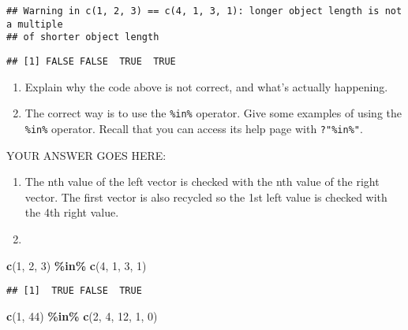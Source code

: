 \documentclass[
]{article}
\newenvironment{Shaded}{\begin{snugshade}}{\end{snugshade}}
\newcommand{\DecValTok}[1]{\textcolor[rgb]{0.00,0.00,0.81}{#1}}
\newcommand{\KeywordTok}[1]{\textcolor[rgb]{0.13,0.29,0.53}{\textbf{#1}}}
\newcommand{\NormalTok}[1]{#1}
\newcommand{\OperatorTok}[1]{\textcolor[rgb]{0.81,0.36,0.00}{\textbf{#1}}}
\newcommand{\StringTok}[1]{\textcolor[rgb]{0.31,0.60,0.02}{#1}}
\providecommand{\tightlist}{%
  \setlength{\itemsep}{0pt}\setlength{\parskip}{0pt}}
\begin{document}
\begin{verbatim}
## Warning in c(1, 2, 3) == c(4, 1, 3, 1): longer object length is not a multiple
## of shorter object length
\end{verbatim}

\begin{verbatim}
## [1] FALSE FALSE  TRUE  TRUE
\end{verbatim}

\begin{enumerate}
\def\labelenumi{\arabic{enumi}.}
\item
  Explain why the code above is not correct, and what's actually
  happening.
\item
  The correct way is to use the \texttt{\%in\%} operator. Give some
  examples of using the \texttt{\%in\%} operator. Recall that you can
  access its help page with \texttt{?"\%in\%"}.
\end{enumerate}

YOUR ANSWER GOES HERE:

\begin{enumerate}
\def\labelenumi{\arabic{enumi}.}
\tightlist
\item
  The nth value of the left vector is checked with the nth value of the
  right vector. The first vector is also recycled so the 1st left value
  is checked with the 4th right value.
\item
\end{enumerate}

\begin{Shaded}
\begin{Highlighting}[]
\KeywordTok{c}\NormalTok{(}\DecValTok{1}\NormalTok{, }\DecValTok{2}\NormalTok{, }\DecValTok{3}\NormalTok{) }\OperatorTok{\%in\%}\StringTok{ }\KeywordTok{c}\NormalTok{(}\DecValTok{4}\NormalTok{, }\DecValTok{1}\NormalTok{, }\DecValTok{3}\NormalTok{, }\DecValTok{1}\NormalTok{)}
\end{Highlighting}
\end{Shaded}

\begin{verbatim}
## [1]  TRUE FALSE  TRUE
\end{verbatim}

\begin{Shaded}
\begin{Highlighting}[]
\KeywordTok{c}\NormalTok{(}\DecValTok{1}\NormalTok{, }\DecValTok{44}\NormalTok{) }\OperatorTok{\%in\%}\StringTok{ }\KeywordTok{c}\NormalTok{(}\DecValTok{2}\NormalTok{, }\DecValTok{4}\NormalTok{, }\DecValTok{12}\NormalTok{, }\DecValTok{1}\NormalTok{, }\DecValTok{0}\NormalTok{)}
\end{Highlighting}
\end{Shaded}
\end{document}
